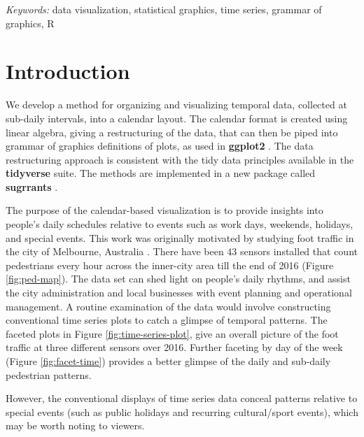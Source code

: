 \documentclass[12pt]{article}
\begin{document}
\noindent%
{\it Keywords:} data visualization, statistical graphics, time series, grammar of graphics, R
\vfill

\newpage
{} %

\hypertarget{introduction}{%
\section{Introduction}\label{introduction}}

We develop a method for organizing and visualizing temporal data,
collected at sub-daily intervals, into a calendar layout. The calendar
format is created using linear algebra, giving a restructuring of the
data, that can then be piped into grammar of graphics definitions of
plots, as used in \textbf{ggplot2} \citep{R-ggplot2}. The data
restructuring approach is consistent with the tidy data principles
available in the \textbf{tidyverse} \citep{R-tidyverse} suite. The
methods are implemented in a new package called \textbf{sugrrants}
\citep{R-sugrrants}.

The purpose of the calendar-based visualization is to provide insights
into people's daily schedules relative to events such as work days,
weekends, holidays, and special events. This work was originally
motivated by studying foot traffic in the city of Melbourne, Australia
\citep{ped}. There have been 43 sensors installed that count pedestrians
every hour across the inner-city area till the end of 2016 (Figure
\ref{fig:ped-map}). The data set can shed light on people's daily
rhythms, and assist the city administration and local businesses with
event planning and operational management. A routine examination of the
data would involve constructing conventional time series plots to catch
a glimpse of temporal patterns. The faceted plots in Figure
\ref{fig:time-series-plot}, give an overall picture of the foot traffic
at three different sensors over 2016. Further faceting by day of the
week (Figure \ref{fig:facet-time}) provides a better glimpse of the
daily and sub-daily pedestrian patterns.

However, the conventional displays of time series data conceal patterns
relative to special events (such as public holidays and recurring
cultural/sport events), which may be worth noting to viewers.
\end{document}
